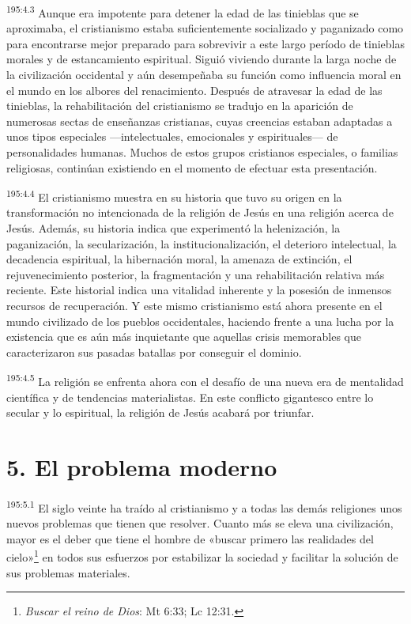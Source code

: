 \par
\textsuperscript{195:4.3} Aunque era impotente para detener la edad de las tinieblas que se aproximaba, el cristianismo estaba suficientemente socializado y paganizado como para encontrarse mejor preparado para sobrevivir a este largo período de tinieblas morales y de estancamiento espiritual. Siguió viviendo durante la larga noche de la civilización occidental y aún desempeñaba su función como influencia moral en el mundo en los albores del renacimiento. Después de atravesar la edad de las tinieblas, la rehabilitación del cristianismo se tradujo en la aparición de numerosas sectas de enseñanzas cristianas, cuyas creencias estaban adaptadas a unos tipos especiales ---intelectuales, emocionales y espirituales--- de personalidades humanas. Muchos de estos grupos cristianos especiales, o familias religiosas, continúan existiendo en el momento de efectuar esta presentación.

\par
\textsuperscript{195:4.4} El cristianismo muestra en su historia que tuvo su origen en la transformación no intencionada de la religión de Jesús en una religión acerca de Jesús. Además, su historia indica que experimentó la helenización, la paganización, la secularización, la institucionalización, el deterioro intelectual, la decadencia espiritual, la hibernación moral, la amenaza de extinción, el rejuvenecimiento posterior, la fragmentación y una rehabilitación relativa más reciente. Este historial indica una vitalidad inherente y la posesión de inmensos recursos de recuperación. Y este mismo cristianismo está ahora presente en el mundo civilizado de los pueblos occidentales, haciendo frente a una lucha por la existencia que es aún más inquietante que aquellas crisis memorables que caracterizaron sus pasadas batallas por conseguir el dominio.

\par
\textsuperscript{195:4.5} La religión se enfrenta ahora con el desafío de una nueva era de mentalidad científica y de tendencias materialistas. En este conflicto gigantesco entre lo secular y lo espiritual, la religión de Jesús acabará por triunfar.

\section*{5. El problema moderno}
\par
\textsuperscript{195:5.1} El siglo veinte ha traído al cristianismo y a todas las demás religiones unos nuevos problemas que tienen que resolver. Cuanto más se eleva una civilización, mayor es el deber que tiene el hombre de «buscar primero las realidades del cielo»\footnote{\textit{Buscar el reino de Dios}: Mt 6:33; Lc 12:31.} en todos sus esfuerzos por estabilizar la sociedad y facilitar la solución de sus problemas materiales.

